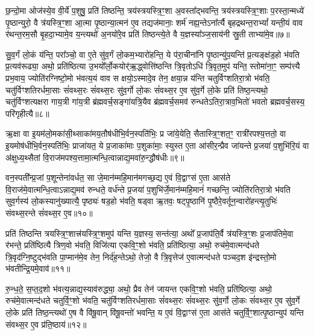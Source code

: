 छ॒न्दो॒मा ओज॑स्ये॒व वी॒र्ये॑ प॒शुषु॒ प्रति॑ तिष्ठन्ति॒ त्रय॑स्त्रयस्त्रि॒ꣳ॒शा अ॒वस्ता᳚द्भवन्ति॒ त्रय॑स्त्रयस्त्रि॒ꣳ॒शाः प॒रस्ता॒न्मध्ये॑ पृ॒ष्ठान्युरो॒ वै त्र॑यस्त्रि॒ꣳ॒शा आ॒त्मा पृ॒ष्ठान्या॒त्मन॑ ए॒व तद्यज॑मानाः॒ शर्म॑ नह्य॒न्ते\-ऽना᳚र्त्यै बृहद्रथन्त॒रा\-भ्यां᳚ यन्ती॒यं वाव र॑थन्त॒रम॒सौ बृ॒हदा॒भ्यामे॒व य॒न्त्यथो॑ अ॒नयो॑रे॒व प्रति॑ तिष्ठन्त्ये॒ते वै य॒ज्ञस्या᳚ञ्ज॒साय॑नी स्रु॒ती ताभ्या॑मे॒व॥७॥

सु॒व॒र्गं लो॒कं य॑न्ति॒ परा᳚ञ्चो॒ वा ए॒ते सु॑व॒र्गं लो॒कम॒भ्यारो॑हन्ति॒ ये प॑रा॒चीना॑नि पृ॒ष्ठान्यु॑प॒यन्ति॑ प्र॒त्यङ्क्ष॑ड॒हो भ॑वति प्र॒त्यव॑रूढ्या॒ अथो॒ प्रति॑ष्ठित्या उ॒भयो᳚र्लो॒कयोर्\mbox{}॑ऋ॒द्ध्वोत्ति॑ष्ठन्ति त्रि॒वृतो\-ऽधि॑ त्रि॒वृत॒मुप॑ यन्ति॒ स्तोमा॑ना॒ꣳ॒ सम्प॑त्त्यै प्रभ॒वाय॒ ज्योति॑रग्निष्टो॒मो भ॑वत्य॒यं वाव स क्षयो॒\-ऽस्मादे॒व तेन॒ क्षया॒न्न य॑न्ति चतुर्विꣳशतिरा॒त्रो भ॑वति॒ चतु॑र्विꣳशतिरर्धमा॒साः सं॑वथ्स॒रः सं॑वथ्स॒रः सु॑व॒र्गो लो॒कः सं॑वथ्स॒र ए॒व सु॑व॒र्गे लो॒के प्रति॑ तिष्ठ॒न्त्यथो॒ चतु॑र्विꣳशत्यक्षरा गाय॒त्री गा॑य॒त्री ब्र॑ह्मवर्च॒सङ्गा॑यत्रि॒यैव ब्र॑ह्मवर्च॒समव॑ रुन्धते\-ऽतिरा॒त्राव॒भितो॑ भवतो ब्रह्मवर्च॒सस्य॒ परि॑गृहीत्यै॥८॥

{\anuvakamend[{म॒नु॒ष्य॑स्य मध्य॒तः प॒शव॒स्ताभ्या॑मे॒व सं॑ वथ्स॒रश्चतु॑र्विꣳशतिश्च॥२॥}]}

ऋ॒क्षा वा इ॒यम॑लो॒मका॑सी॒थ्साका॑मय॒तौष॑धीभि॒र्वन॒स्पति॑भिः॒ प्र जा॑ये॒येति॒ सैतास्त्रि॒ꣳ॒शत॒ꣳ॒ रात्री॑रपश्य॒त्ततो॒ वा इ॒यमोष॑धीभि॒र्वन॒स्पति॑भिः॒ प्राजा॑यत॒ ये प्र॒जाका॑माः प॒शुका॑माः॒ स्युस्त ए॒ता आ॑सीर॒न्प्रैव जा॑यन्ते प्र॒जया॑ प॒शुभि॑रि॒यं वा अ॑क्षुध्य॒थ्सैतां वि॒राज॑मपश्य॒त्तामा॒त्मन्धि॒त्वान्नाद्य॒मवा॑रु॒न्द्धौष॑धीः॥९॥

वन॒स्पती᳚न्प्र॒जां प॒शून्तेना॑वर्धत॒ सा जे॒मान॑म्महि॒मान॑मगच्छ॒द्य ए॒वं वि॒द्वाꣳस॑ ए॒ता आस॑ते वि॒राज॑मे॒वात्मन्धि॒त्वा\-ऽन्नाद्य॒मव॑ रुन्धते॒ वर्ध॑न्ते प्र॒जया॑ प॒शुभि॑र्जे॒मान॑म्महि॒मानं॑ गच्छन्ति॒ ज्योति॑रतिरा॒त्रो भ॑वति सुव॒र्गस्य॑ लो॒कस्यानु॑\-ख्यात्यै॒ पृष्ठ्यः॑ षड॒हो भ॑वति॒ षड्वा ऋ॒तवः॒ षट्पृ॒ष्ठानि॑ पृ॒ष्ठैरे॒वर्तून॒न्वारो॑हन्त्यृ॒तुभिः॑ संवथ्स॒रन्ते सं॑वथ्स॒र ए॒व॥१०॥

प्रति॑ तिष्ठन्ति त्रयस्त्रि॒ꣳ॒शात्त्र॑यस्त्रि॒ꣳ॒शमुप॑ यन्ति य॒ज्ञस्य॒ सन्त॑त्या॒ अथो᳚ प्र॒जाप॑ति॒र्वै त्र॑यस्त्रि॒ꣳ॒शः प्र॒जाप॑तिमे॒वा र॑भन्ते॒ प्रति॑ष्ठित्यै त्रिण॒वो भ॑वति॒ विजि॑त्या एकवि॒ꣳ॒शो भ॑वति॒ प्रति॑ष्ठित्या॒ अथो॒ रुच॑मे॒वात्मन्द॑धते त्रि॒वृद॑ग्नि॒ष्टुद्भ॑वति पा॒प्मान॑मे॒व तेन॒ निर्द॑ह॒न्ते\-ऽथो॒ तेजो॒ वै त्रि॒वृत्तेज॑ ए॒वात्मन्द॑धते पञ्चद॒श इ॑न्द्रस्तो॒मो भ॑वतीन्द्रि॒यमे॒वाव॑॥११॥

रु॒न्ध॒ते॒ स॒प्त॒द॒शो भ॑वत्य॒न्नाद्य॒स्याव॑रुद्ध्या॒ अथो॒ प्रैव तेन॑ जायन्त एकवि॒ꣳ॒शो भ॑वति॒ प्रति॑ष्ठित्या॒ अथो॒ रुच॑मे॒वात्मन्द॑धते चतुर्वि॒ꣳ॒शो भ॑वति॒ चतु॑र्विꣳशतिरर्धमा॒साः सं॑वथ्स॒रः सं॑वथ्स॒रः सु॑व॒र्गो लो॒कः सं॑वथ्स॒र ए॒व सु॑व॒र्गे लो॒के प्रति॑ तिष्ठ॒न्त्यथो॑ ए॒ष वै वि॑षू॒वान् वि॑षू॒वन्तो॑ भवन्ति॒ य ए॒वं वि॒द्वाꣳस॑ ए॒ता आस॑ते चतुर्वि॒ꣳ॒शात्पृ॒ष्ठान्युप॑ यन्ति संवथ्स॒र ए॒व प्र॑ति॒ष्ठाय॑॥१२॥

